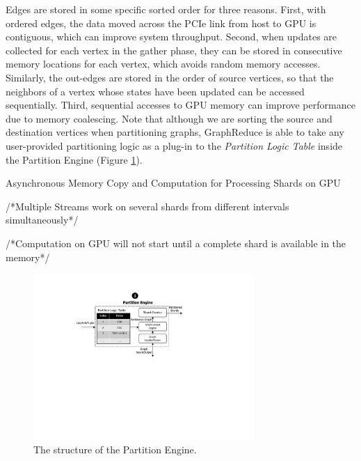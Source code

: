 Edges are stored in some specific sorted order for three reasons. First, with ordered edges, the data moved across the 
PCIe link from host to GPU is contiguous, which can improve system throughput. Second, when updates are collected 
for each vertex in the gather phase, they can be stored in consecutive memory locations for each vertex, which avoids random memory 
accesses. Similarly, the out-edges are stored in the order of source vertices, so that the neighbors of a vertex whose states 
have been updated can be accessed sequentially. Third, sequential accesses to GPU memory can improve performance due 
to memory coalescing. Note that although we are sorting the source and destination vertices when partitioning graphs, GraphReduce is able to take any user-provided partitioning logic as a plug-in to the \textit{Partition Logic Table} inside the Partition Engine (Figure \ref{fig:big2}). 



\begin{algorithm}[htp]
{%
\caption{\footnotesize \label{asynchronous} Asynchronous Memory Copy and Computation for Processing Shards on GPU} 
\label{alg1}
\begin{algorithmic}[1]

/*{Multiple Streams work on several shards from different intervals simultaneously}*/

/*{Computation on GPU will not start until a complete shard is available in the memory}*/

\end{algorithmic}
}
\end{algorithm}



\begin{figure}[!t]
\centering
\includegraphics[width=0.75\textwidth,height=0.75\textheight,keepaspectratio]{figures/big2.pdf}
\caption{ The structure of the Partition Engine.}
\label{fig:big2}
\end{figure}


